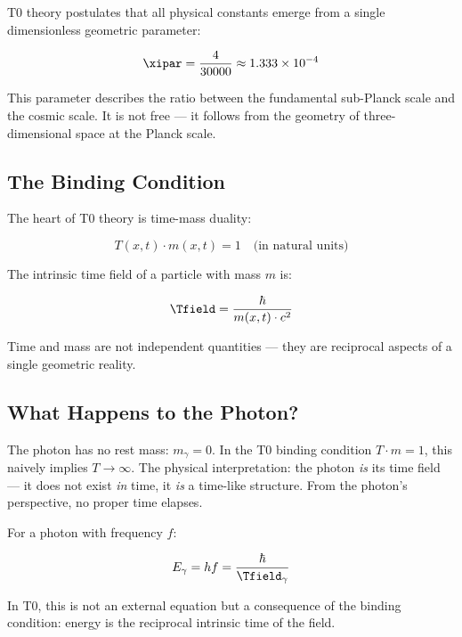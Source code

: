 T0 theory postulates that all physical constants emerge from a single dimensionless 
geometric parameter:

\begin{equation}
    \xipar = \frac{4}{30000} \approx 1.333 \times 10^{-4}
    \label{eq:xi_definition}
\end{equation}

This parameter describes the ratio between the fundamental sub-Planck scale and the 
cosmic scale. It is not free — it follows from the geometry of three-dimensional 
space at the Planck scale.

\subsection{The Binding Condition}

The heart of T0 theory is time-mass duality:

\begin{equation}
    T(x,t) \cdot m(x,t) = 1 \quad \text{(in natural units)}
    \label{eq:t0_constraint}
\end{equation}

The intrinsic time field of a particle with mass $m$ is:

\begin{equation}
    \Tfield = \frac{\hbar}{m(x,t) \cdot c^2}
    \label{eq:timefield}
\end{equation}

Time and mass are not independent quantities — they are reciprocal aspects of a 
single geometric reality.

\subsection{What Happens to the Photon?}

The photon has no rest mass: $m_\gamma = 0$. In the T0 binding condition 
$T \cdot m = 1$, this naively implies $T \to \infty$. The physical interpretation: 
the photon \emph{is} its time field — it does not exist \emph{in} time, it 
\emph{is} a time-like structure. From the photon's perspective, no proper time elapses.

For a photon with frequency $f$:

\begin{equation}
    E_\gamma = hf = \frac{\hbar}{\Tfield_\gamma}
    \label{eq:photon_energy_t0}
\end{equation}

In T0, this is not an external equation but a consequence of the binding condition: 
energy is the reciprocal intrinsic time of the field.

